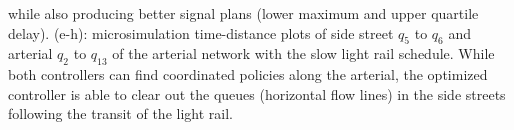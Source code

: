\begin{figure*}[t!]
{while also producing better signal plans (lower maximum and upper quartile delay).
%
%
%
(e-h): microsimulation time-distance plots of side street $q_5$ to $q_6$ and
arterial $q_2$ to $q_{13}$ of the arterial network with the slow light rail schedule.
While both controllers can find coordinated policies along the arterial, the optimized
controller is able to clear out the queues (horizontal flow lines) in the side streets following the transit of
the light rail. 
%
%
}
%
\label{fig:delayCurveAndBoxplot}
\label{fig:network1_microsim}
\end{figure*}


